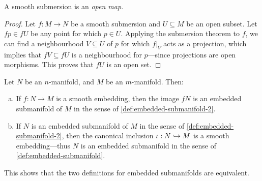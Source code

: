 
\begin{corollary}
    \label{cor:submersion-is-open}
    A smooth submersion is an \emph{open map}.
\end{corollary}

\begin{proof}
    Let \(f: M \to N\) be a smooth submersion and \(U \subseteq M\) be an open
    subset. Let \(f p \in f U\) be any point for which \(p \in U\). Applying the
    submersion theorem to \(f\), we can find a neighbourhood \(V \subseteq U\) of
    \(p\) for which \(f|_V\) acts as a projection, which implies that
    \(f V \subseteq f U\) is a neighbourhood for \(p\)---since projections are open
    morphisms. This proves that \(f U\) is an open set.
\end{proof}

\begin{theorem}
    \label{thm:embedded-submanifold-equivalent-definitions}
    Let \(N\) be an \(n\)-manifold, and \(M\) be an \(m\)-manifold. Then:
    \begin{enumerate}[(a)]\setlength\itemsep{0em}
        \item If \(f: N \to M\) is a smooth embedding, then the image \(f N\) is an
              embedded submanifold of \(M\) in the sense of
              \cref{def:embedded-submanifold-2}.

        \item If \(N\) is an embedded submanifold of \(M\) in the sense of
              \cref{def:embedded-submanifold-2}, then the canonical inclusion
              \(\iota: N \hookrightarrow M\) is a smooth embedding---thus \(N\) is an embedded
              submanifold in the sense of \cref{def:embedded-submanifold}.
    \end{enumerate}
    This shows that the two definitions for embedded submanifolds are equivalent.
\end{theorem}

